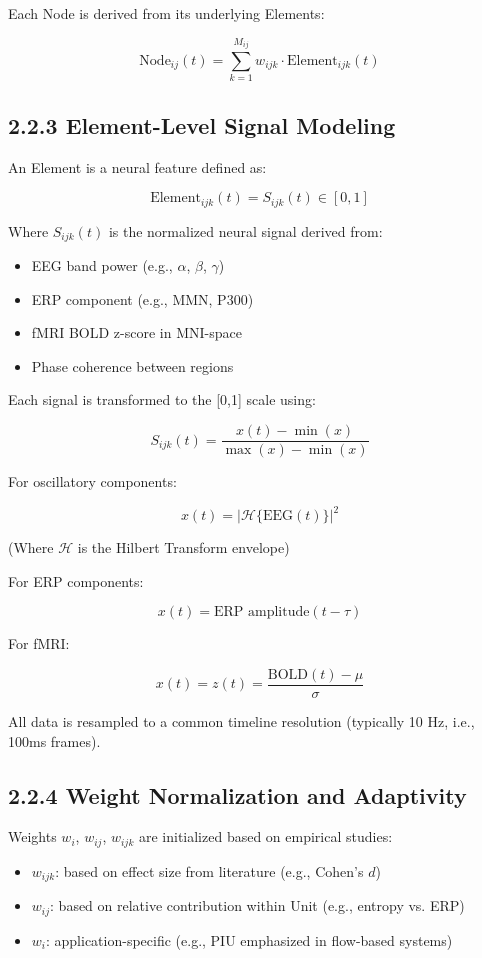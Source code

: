 \documentclass[10pt]{article}
\begin{document}
Each Node is derived from its underlying Elements:

\[
\text{Node}_{ij}(t) = \sum_{k=1}^{M_{ij}} w_{ijk} \cdot \text{Element}_{ijk}(t)
\]

\subsection*{2.2.3 Element-Level Signal Modeling}

An Element is a neural feature defined as:

\[
\text{Element}_{ijk}(t) = S_{ijk}(t) \in [0,1]
\]

Where $S_{ijk}(t)$ is the normalized neural signal derived from:

\begin{itemize}
    \item EEG band power (e.g., $\alpha$, $\beta$, $\gamma$)
    \item ERP component (e.g., MMN, P300)
    \item fMRI BOLD z-score in MNI-space
    \item Phase coherence between regions
\end{itemize}

Each signal is transformed to the [0,1] scale using:

\[
S_{ijk}(t) = \frac{x(t) - \min(x)}{\max(x) - \min(x)}
\]

For oscillatory components:

\[
x(t) = \left| \mathcal{H}\{ \text{EEG}(t) \} \right|^2
\]

(Where $\mathcal{H}$ is the Hilbert Transform envelope)

For ERP components:

\[
x(t) = \text{ERP amplitude}(t - \tau)
\]

For fMRI:

\[
x(t) = z(t) = \frac{\text{BOLD}(t) - \mu}{\sigma}
\]

All data is resampled to a common timeline resolution (typically 10 Hz, i.e., 100ms frames).

\subsection*{2.2.4 Weight Normalization and Adaptivity}

Weights $w_i$, $w_{ij}$, $w_{ijk}$ are initialized based on empirical studies:

\begin{itemize}
    \item $w_{ijk}$: based on effect size from literature (e.g., Cohen’s $d$)
    \item $w_{ij}$: based on relative contribution within Unit (e.g., entropy vs. ERP)
    \item $w_i$: application-specific (e.g., PIU emphasized in flow-based systems)
\end{itemize}
\end{document}
